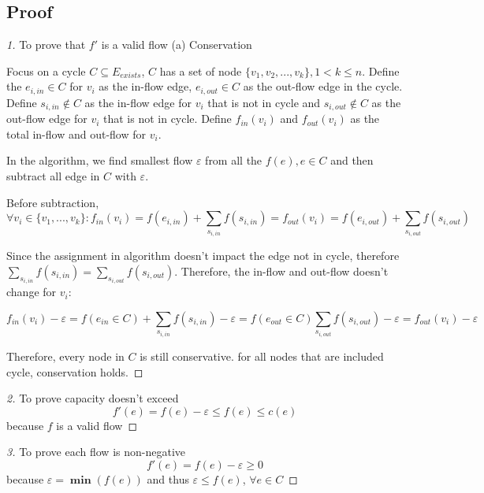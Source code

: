 \documentclass[openany]{article}
\begin{document}
\subsection*{Proof}
\begin{proof}[1]{To prove that $f'$ is a valid flow}
(a) Conservation

Focus on a cycle $C \subseteq E_{exists}$, $C$ has a set of node $\{v_1, v_2, ..., v_k\}, 1 < k \leq n$. Define the $e_{i,in} \in C$ for $v_i$ as the in-flow edge, $e_{i,out} \in C$ as the out-flow edge in the cycle. Define $s_{i,in} \notin C$ as the in-flow edge for $v_i$ that is not in cycle and $s_{i,out} \notin C$ as the out-flow edge for $v_i$ that is not in cycle. Define $f_{in}(v_i)$ and $f_{out}(v_i)$ as the total in-flow and out-flow for $v_i$.

In the algorithm, we find smallest flow $\varepsilon$ from all the $f(e), e\in C$ and then subtract all edge in $C$ with $\varepsilon$.

Before subtraction, \[\forall v_i \in \{v_1, ..., v_k\}: f_{in}(v_i) = f(e_{i,in}) + \sum_{s_{i,in}} f(s_{i,in}) = f_{out}(v_i) = f(e_{i,out})+\sum_{s_{i,out}} f(s_{i,out}) \]

Since the assignment in algorithm doesn't impact the edge not in cycle, therefore $\sum_{s_{i,in}} f(s_{i,in}) = \sum_{s_{i,out}} f(s_{i,out})$. Therefore, the in-flow and out-flow doesn't change for $v_i$:

\[f_{in}(v_i) - \varepsilon = f(e_{in} \in C) + \sum_{s_{i,in}} f(s_{i,in}) - \varepsilon = f(e_{out} \in C) \sum_{s_{i,out}} f(s_{i,out}) - \varepsilon = f_{out}(v_i) - \varepsilon\]

Therefore, every node in $C$ is still conservative. for all nodes that are included cycle, conservation holds.


\end{proof}

\begin{proof}[2]{To prove capacity doesn't exceed}
    \[f'(e) = f(e) - \varepsilon \leq f(e) \leq c(e)\] because $f$ is a valid flow
    
\end{proof}

\begin{proof}[3]{To prove each flow is non-negative}
    \[f'(e) = f(e) - \varepsilon \geq 0\] because $\varepsilon = \mathbf{\min}(f(e))$ and thus $\varepsilon \leq f(e)$, $\forall e \in C$
    
\end{proof}
\end{document}
